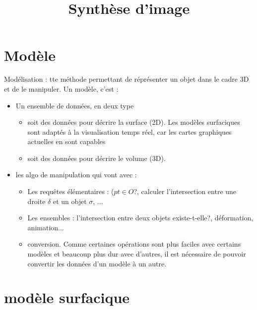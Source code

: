\documentclass[11pt]{article}
\title{Synthèse d'image}
\begin{document}
\maketitle

\section{Modèle}
Modélisation : tte méthode permettant de réprésenter un objet dans le cadre 3D et de le manipuler.
Un modèle, c'est :

\begin{itemize}
	\item Un ensemble de données, en deux type
	\begin{itemize}
		\item soit des données pour décrire la surface (2D). Les modèles surfaciques sont adaptés à la visualisation temps réel, car les cartes graphiques actuelles en sont capables
			\item soit des données pour décrire le volume (3D).
	\end{itemize}
	\item les algo de manipulation qui vont avec : 
	\begin{itemize}
		\item Les requêtes élémentaires : ($pt \in O$?, calculer l'intersection entre une droite $\delta$ et un objet $\sigma$, ...
		\item Les ensembles : l'intersection entre deux objets existe-t-elle?, déformation, animation...
		\item conversion. Comme certaines opérations sont plus faciles avec certains modèles et beaucoup plus dur avec d'autres, il est nécessaire de pouvoir convertir les données d'un modèle à un autre.
	\end{itemize}
\end{itemize}

\section{modèle surfacique}
\end{document}
